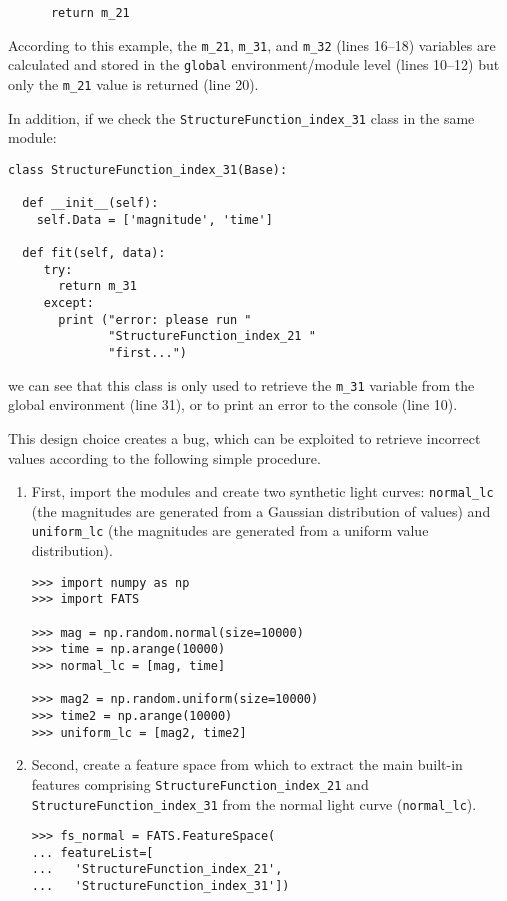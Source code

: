 \documentclass[final,5p,times,twocolumn,authoryear]{elsarticle}
\begin{document}
\begin{description}
\begin{verbatim}
      return m_21
  \end{verbatim}
  
According to this example, the \texttt{m\_21}, 
\texttt{m\_31}, and \texttt{m\_32} (lines 16--18) variables are calculated and stored in the
\texttt{global} environment/module level (lines 10--12) but only the 
\texttt{m\_21} value is returned (line 20). 

In addition, if we check the \texttt{StructureFunction\_index\_31} class
in the same module:
%
\begin{verbatim}
class StructureFunction_index_31(Base):
  
  def __init__(self):
    self.Data = ['magnitude', 'time']
  
  def fit(self, data):
     try:
       return m_31
     except:
       print ("error: please run "
              "StructureFunction_index_21 "
              "first...")
\end{verbatim}
%
we can see that this class is only used to retrieve the 
\texttt{m\_31} variable from the global 
environment (line 31), or to print an error to the console (line 10).

This design choice creates a bug, which can be  
exploited to retrieve incorrect values according to the following simple
procedure.
%
\begin{enumerate}
\item First, import the modules and create two synthetic light curves: 
	\texttt{normal\_lc} (the magnitudes are generated from a Gaussian distribution of values) 
	and \texttt{uniform\_lc} (the magnitudes are generated from a uniform value distribution).
\begin{verbatim}
>>> import numpy as np
>>> import FATS

>>> mag = np.random.normal(size=10000)
>>> time = np.arange(10000)
>>> normal_lc = [mag, time]

>>> mag2 = np.random.uniform(size=10000)
>>> time2 = np.arange(10000)
>>> uniform_lc = [mag2, time2]
\end{verbatim}

\item Second, create a feature space from which to extract the main built-in features comprising 
	\texttt{StructureFunction\_index\_21} and \texttt{StructureFunction\_index\_31} from the 
	normal light curve (\texttt{normal\_lc}).
\begin{verbatim}
>>> fs_normal = FATS.FeatureSpace(
... featureList=[
...   'StructureFunction_index_21',
...   'StructureFunction_index_31'])


\end{verbatim}
\end{enumerate}
\end{description}
\end{document}
